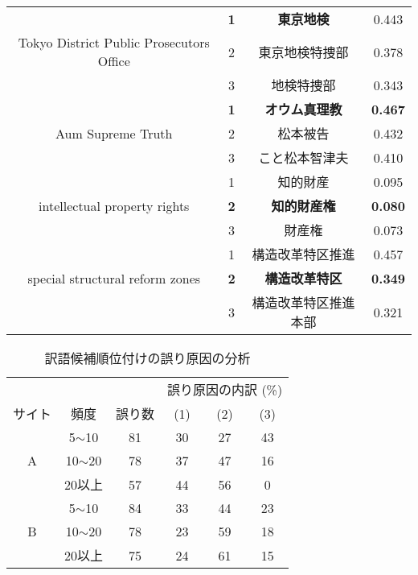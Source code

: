 \begin{table}
\begin{center}
{\begin{tabular}{|c||c|c|c|}
& {\bf 1} & {\bf 東京地検} & 0.443 \\ \cline{2-4}
  Tokyo District Public Prosecutors Office 
& 2 & 東京地検特捜部 & 0.378 \\ \cline{2-4}
& 3 & 地検特捜部 & 0.343 \\ \hline\hline
& {\bf 1} & {\bf オウム真理教} & {\bf 0.467} \\ \cline{2-4}
  Aum Supreme Truth 
& 2 & 松本被告 & 0.432 \\ \cline{2-4}
& 3 & こと松本智津夫 & 0.410 \\ \hline\hline
& 1 & 知的財産 & 0.095 \\ \cline{2-4}
  intellectual property rights 
& {\bf 2} & {\bf 知的財産権} & {\bf 0.080} \\ \cline{2-4}
& 3 & 財産権 & 0.073 \\ \hline\hline
& 1 & 構造改革特区推進 & 0.457 \\ \cline{2-4}
  special structural reform zones 
& {\bf 2} & {\bf 構造改革特区} & {\bf 0.349} \\ \cline{2-4}
& 3 & 構造改革特区推進本部 & 0.321 \\ \hline
  \end{tabular}
}
\end{center}
\end{table}

\begin{table}
\begin{center}
 \caption{訳語候補順位付けの誤り原因の分析}
 \label{tab:wrong}
{
  \begin{tabular}{|c|c|c|c|c|c|}
   \hline
       &  &   & \multicolumn{3}{|c|}{誤り原因の内訳 (\%)}     \\ \cline{4-6}
サイト & 頻度  & 誤り数 &  \hspace*{.25cm}(1)\hspace*{.25cm}     
              & \hspace*{.25cm}(2)\hspace*{.25cm}  & \hspace*{.25cm}(3)\hspace*{.25cm}    \\ \hline\hline
       & 5$\sim$10  & 81 & 30       & 27    & 43       \\ \cline{2-6} 
A      & 10$\sim$20 & 78 & 37       & 47    & 16     \\ \cline{2-6} 
       & 20以上& 57 & 44            & 56    & 0       \\ \hline
       & 5$\sim$10  & 84 & 33       & 44    & 23      \\ \cline{2-6} 
B       & 10$\sim$20 & 78 & 23      & 59    & 18      \\ \cline{2-6} 
      & 20以上& 75 & 24             & 61    & 15       \\ \hline
  \end{tabular}
}
\end{center}
\end{table}

